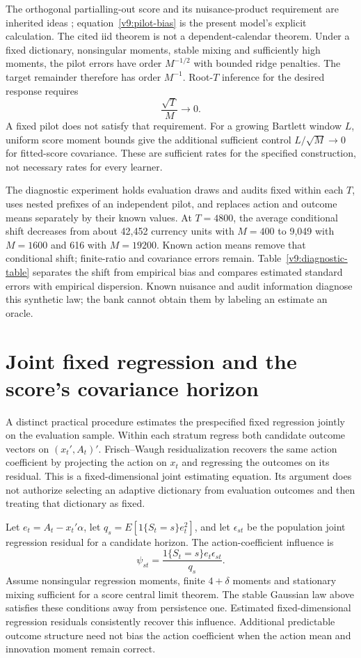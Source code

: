The orthogonal partialling-out score and its nuisance-product requirement are
inherited ideas \citep[Section 4.1, equation (4.4), Assumption 4.1]{dml2018};
equation~\eqref{v9:pilot-bias} is the present model's explicit calculation.
The cited iid theorem is not a dependent-calendar theorem. Under a fixed
dictionary, nonsingular moments, stable mixing and sufficiently high moments,
the pilot errors have order $M^{-1/2}$ with bounded ridge penalties. The target
remainder therefore has order $M^{-1}$. Root-$T$ inference for the desired
response requires
\[
 \frac{\sqrt T}{M}\longrightarrow0.
\]
A fixed pilot does not satisfy that requirement. For a growing Bartlett
window $L$, uniform score moment bounds give the additional sufficient control
$L/\sqrt M\to0$ for fitted-score covariance. These are sufficient rates for
the specified construction, not necessary rates for every learner.

The diagnostic experiment holds evaluation draws and audits fixed within each
$T$, uses nested prefixes of an independent pilot, and replaces action and
outcome means separately by their known values. At $T=4800$, the average
conditional shift decreases from about 42,452 currency units with $M=400$ to
9,049 with $M=1600$ and 616 with $M=19200$. Known action means remove that
conditional shift; finite-ratio and covariance errors remain.
Table~\ref{v9:diagnostic-table} separates the shift from empirical bias and
compares estimated standard errors with empirical dispersion. Known nuisance
and audit information diagnose this synthetic law; the bank cannot obtain
them by labeling an estimate an oracle.

\section{Joint fixed regression and the score's covariance horizon}
\label{v9:covariance}

A distinct practical procedure estimates the prespecified fixed regression
jointly on the evaluation sample. Within each stratum regress both candidate
outcome vectors on $(x_t',A_t)'$. Frisch--Waugh residualization recovers the
same action coefficient by projecting the action on $x_t$ and regressing the
outcomes on its residual. This is a fixed-dimensional joint estimating
equation. Its argument does not authorize selecting an adaptive dictionary
from evaluation outcomes and then treating that dictionary as fixed.

Let $e_t=A_t-x_t'\alpha$, let
$q_s=E[1\{S_t=s\}e_t^2]$, and let $\epsilon_{st}$ be the population joint
regression residual for a candidate horizon. The action-coefficient influence is
\[
 \psi_{st}=\frac{1\{S_t=s\}e_t\epsilon_{st}}{q_s}.
\]
Assume nonsingular regression moments, finite $4+\delta$ moments and stationary
mixing sufficient for a score central limit theorem. The stable Gaussian law
above satisfies these conditions away from persistence one. Estimated
fixed-dimensional regression residuals consistently recover this influence.
Additional predictable outcome structure need not bias the action coefficient
when the action mean and innovation moment remain correct.

